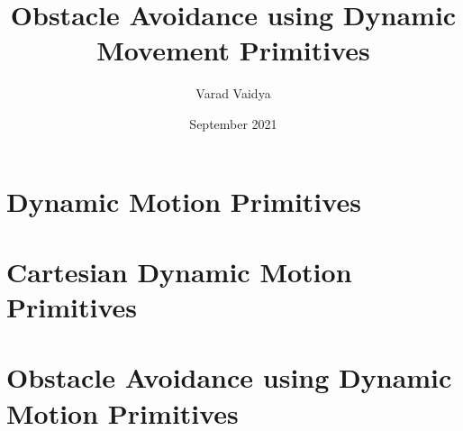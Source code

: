 \documentclass[12pt,A4paper]{report}
\title{Obstacle Avoidance using Dynamic Movement Primitives}
\author{Varad Vaidya}
\date{September 2021}
\begin{document}


\tableofcontents

\chapter{Dynamic Motion Primitives}


% 
\chapter{Cartesian Dynamic Motion Primitives}


\chapter{Obstacle Avoidance using Dynamic Motion Primitives}

\end{document}
